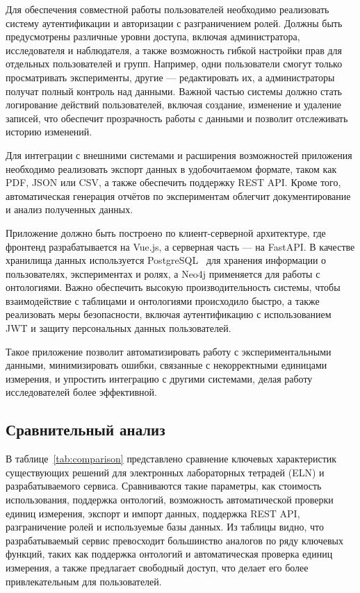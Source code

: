Для обеспечения совместной работы пользователей необходимо реализовать систему аутентификации и авторизации с разграничением ролей. Должны быть предусмотрены различные уровни доступа, включая администратора, исследователя и наблюдателя, а также возможность гибкой настройки прав для отдельных пользователей и групп. Например, одни пользователи смогут только просматривать эксперименты, другие — редактировать их, а администраторы получат полный контроль над данными. Важной частью системы должно стать логирование действий пользователей, включая создание, изменение и удаление записей, что обеспечит прозрачность работы с данными и позволит отслеживать историю изменений.

Для интеграции с внешними системами и расширения возможностей приложения необходимо реализовать экспорт данных в удобочитаемом формате, таком как PDF, JSON или CSV, а также обеспечить поддержку REST API\cite{arch:REST}. Кроме того, автоматическая генерация отчётов по экспериментам облегчит документирование и анализ полученных данных.

Приложение должно быть построено по клиент-серверной архитектуре, где фронтенд разрабатывается на Vue.js\cite{Framework:VueJS}, а серверная часть — на FastAPI\cite{Framework:FastAPI}. В качестве хранилища данных используется PostgreSQL~\cite{DB:PostgreSQL} для хранения информации о пользователях, экспериментах и ролях, а Neo4j применяется для работы с онтологиями. Важно обеспечить высокую производительность системы, чтобы взаимодействие с таблицами и онтологиями происходило быстро, а также реализовать меры безопасности, включая аутентификацию с использованием JWT\cite{Security:JWT} и защиту персональных данных пользователей.

Такое приложение позволит автоматизировать работу с экспериментальными данными, минимизировать ошибки, связанные с некорректными единицами измерения, и упростить интеграцию с другими системами, делая работу исследователей более эффективной.

\subsection{Сравнительный анализ}

В таблице~\ref{tab:comparison} представлено сравнение ключевых характеристик существующих решений для электронных лабораторных тетрадей (ELN) и разрабатываемого сервиса. Сравниваются такие параметры, как стоимость использования, поддержка онтологий, возможность автоматической проверки единиц измерения, экспорт и импорт данных, поддержка REST API, разграничение ролей и используемые базы данных. Из таблицы видно, что разрабатываемый сервис превосходит большинство аналогов по ряду ключевых функций, таких как поддержка онтологий и автоматическая проверка единиц измерения, а также предлагает свободный доступ, что делает его более привлекательным для пользователей.

